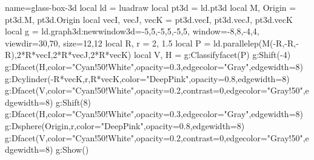 \documentclass[border=5pt]{standalone}
\begin{document}
\begin{luadraw}{name=glass-box-3d}
local ld = luadraw
local pt3d = ld.pt3d
local M, Origin = pt3d.M, pt3d.Origin
local vecI, vecJ, vecK = pt3d.vecI, pt3d.vecJ, pt3d.vecK
local g = ld.graph3d:new{window3d={-5,5,-5,5,-5,5}, window={-8,8,-4,4}, viewdir={30,70}, size={12,12}}
local R, r = 2, 1.5
local P = ld.parallelep(M(-R,-R,-R),2*R*vecI,2*R*vecJ,2*R*vecK)
local V, H = g:Classifyfacet(P)
g:Shift(-4)
g:Dfacet(H,{color="Cyan!50!White",opacity=0.3,edgecolor="Gray",edgewidth=8})
g:Dcylinder(-R*vecK,r,R*vecK,{color="DeepPink",opacity=0.8,edgewidth=8})
g:Dfacet(V,{color="Cyan!50!White",opacity=0.2,contrast=0,edgecolor="Gray!50",edgewidth=8})
g:Shift(8)
g:Dfacet(H,{color="Cyan!50!White",opacity=0.3,edgecolor="Gray",edgewidth=8})
g:Dsphere(Origin,r,{color="DeepPink",opacity=0.8,edgewidth=8})
g:Dfacet(V,{color="Cyan!50!White",opacity=0.2,contrast=0,edgecolor="Gray!50",edgewidth=8})
g:Show()
\end{luadraw}
\end{document}
